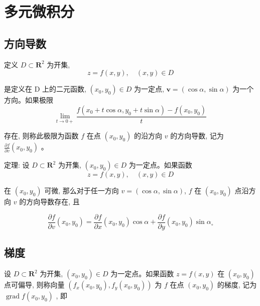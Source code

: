 \documentclass{book}
\begin{document}




\section{多元微积分}
\subsection{方向导数}
定义 $D \subset \mathbf{R}^{2}$  为开集,
\begin{equation}
    z=f(x, y), \quad(x, y) \in D
\end{equation}

是定义在  D  上的二元函数,  $\left(x_{0}, y_{0}\right) \in D$  为一定点,  $\boldsymbol{v}=(\cos \alpha, \sin \alpha)$  为一个方向。如果极限
\begin{equation}
    \lim _{t \rightarrow 0+} \frac{f\left(x_{0}+t \cos \alpha, y_{0}+t \sin \alpha\right)-f\left(x_{0}, y_{0}\right)}{t}
\end{equation}

存在, 则称此极限为函数  $f$  在点  $\left(x_{0}, y_{0}\right)$  的沿方向  $v$  的方向导数, 记为  $\frac{\partial f}{\partial v}\left(x_{0}, y_{0}\right)$  。

定理: 设  $D \subset \mathbf{R}^{2}$  为开集,  $\left(x_{0}, y_{0}\right) \in D$  为一定点。如果函数
\begin{equation}
    z=f(x, y), \quad(x, y) \in D
\end{equation}

在  $\left(x_{0}, y_{0}\right)$  可微, 那么对于任一方向  $v=(\cos \alpha, \sin \alpha)$, $f$  在  $\left(x_{0}, y_{0}\right)$  点沿方向  $v$ 的方向导数存在, 且

\begin{equation}
    \frac{\partial f}{\partial v}\left(x_{0}, y_{0}\right)=\frac{\partial f}{\partial x}\left(x_{0}, y_{0}\right) \cos \alpha+\frac{\partial f}{\partial y}\left(x_{0}, y_{0}\right) \sin \alpha_{\circ}
\end{equation}

\subsection{梯度} 设  $D \subset \mathbf{R}^{2}$  为开集,  $\left(x_{0}, y_{0}\right) \in D$  为一定点。如果函数  $z=   f(x, y)$  在  $\left(x_{0}, y_{0}\right)$  点可偏导, 则称向量  $\left(f_{x}\left(x_{0}, y_{0}\right), f_{y}\left(x_{0}, y_{0}\right)\right)$  为  $f$  在点  $\left(x_{0}\right. ,  \left.y_{0}\right)$  的梯度, 记为  $\operatorname{grad} f\left(x_{0}, y_{0}\right)$ , 即
\end{document}

